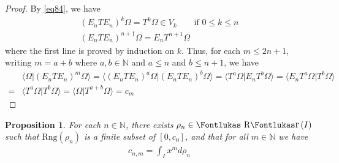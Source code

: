 \documentclass[12pt,b5paper,notitlepage]{article}
\theoremstyle{definition}
\theoremstyle{plain}
\newtheorem{pp}[df]{Proposition}
\DeclareMathOperator{\Rr}{\text{\Fontlukas R}\text{\kern -0pt {\Fontlukas\large r}}\,}
\newcommand{\bk}[1]{\langle {#1}\rangle}
\newcommand{\Nbb}{\mathbb N}
\newcommand{\Rng}{\mathrm{Rng}}
\numberwithin{equation}{section}
\begin{document}
\begin{proof}
By \eqref{eq84}, we have 
\begin{subequations}\label{eq102}
\begin{gather}
(E_nTE_n)^k\Omega=T^k\Omega\in V_k\qquad \text{if }0\leq k\leq n\\
(E_nTE_n)^{n+1}\Omega=E_nT^{n+1}\Omega
\end{gather}
\end{subequations}
where the first line is proved by induction on $k$. Thus, for each $m\leq 2n+1$, writing $m=a+b$ where $a,b\in\Nbb$ and $a\leq n$ and $b\leq n+1$, we have
\begin{align*}
&\bk{\Omega|(E_nTE_n)^m\Omega}=\bk{(E_nTE_n)^a\Omega|(E_nTE_n)^b\Omega}=\bk{T^a\Omega|E_nT^b\Omega}=\bk{E_nT^a\Omega|T^b\Omega}\\
=&\bk{T^a\Omega|T^b\Omega}=\bk{\Omega|T^{a+b}\Omega}=c_m
\end{align*}
\end{proof}

\begin{pp}\label{lb174}
For each $n\in\Nbb$, there exists $\rho_n\in\Rr(I)$ such that $\Rng(\rho_n)$ is a finite subset of $[0,c_0]$, and that  for all $m\in\Nbb$ we have
\begin{align}\label{eq87}
c_{n,m}=\int_I x^md\rho_n
\end{align}
\end{pp}
\end{document}
